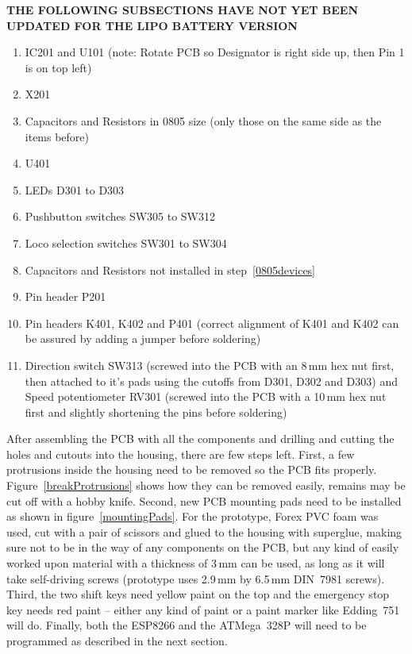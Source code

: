 \documentclass[11pt,a4paper]{scrartcl}
\begin{document}
\textbf{THE FOLLOWING SUBSECTIONS HAVE NOT YET BEEN UPDATED FOR THE LIPO BATTERY VERSION}

\begin{enumerate}
\item IC201 and U101 (note: Rotate PCB so Designator is right side up, then Pin 1 is on top left)
\item X201
\item Capacitors and Resistors in 0805 size (only those on the same side as the items before) \label{0805devices}
\item U401
\item LEDs D301 to D303
\item Pushbutton switches SW305 to SW312
\item Loco selection switches SW301 to SW304
\item Capacitors and Resistors not installed in step~\ref{0805devices}
\item Pin header P201
\item Pin headers K401, K402 and P401 (correct alignment of K401 and K402 can be assured by adding a jumper before soldering)
\item Direction switch SW313 (screwed into the PCB with an 8\,mm hex nut first, then attached to it's pads using the cutoffs from D301, D302 and D303) and Speed potentiometer RV301 (screwed into the PCB with a 10\,mm hex nut first and slightly shortening the pins before soldering)
\end{enumerate}

After assembling the PCB with all the components and drilling and cutting the holes and cutouts into the housing, there are few steps left. First, a few protrusions inside the housing need to be removed so the PCB fits properly. Figure~\ref{breakProtrusions} shows how they can be removed easily, remains may be cut off with a hobby knife. Second, new PCB mounting pads need to be installed as shown in figure~\ref{mountingPads}. For the prototype, Forex PVC foam was used, cut with a pair of scissors and glued to the housing with superglue, making sure not to be in the way of any components on the PCB, but any kind of easily worked upon material with a thickness of 3\,mm can be used, as long as it will take self-driving screws (prototype uses 2.9\,mm by 6.5\,mm DIN~7981 screws). Third, the two shift keys need yellow paint on the top and the emergency stop key needs red paint -- either any kind of paint or a paint marker like Edding~751 will do. Finally, both the ESP8266 and the ATMega~328P will need to be programmed as described in the next section.
\end{document}

